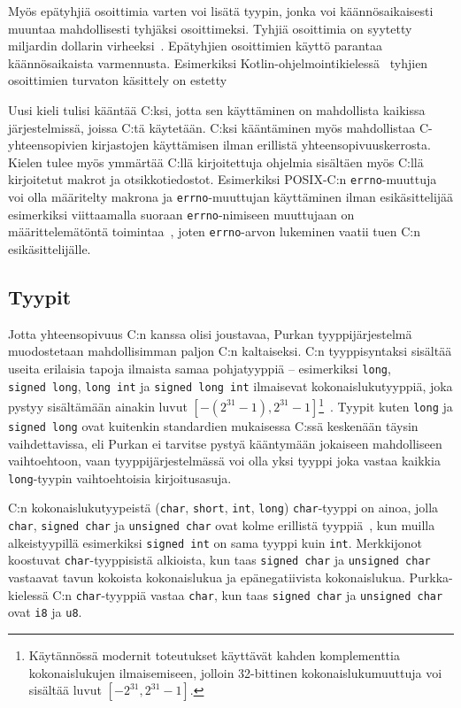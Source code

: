 Myös epätyhjiä osoittimia varten voi lisätä tyypin, jonka voi käännösaikaisesti
muuntaa mahdollisesti tyhjäksi osoittimeksi. Tyhjiä osoittimia on syytetty
miljardin dollarin virheeksi~\citep{billiondollars}. Epätyhjien osoittimien
käyttö parantaa käännösaikaista varmennusta. Esimerkiksi
Kotlin-ohjelmointikielessä~\citep{kotlin} tyhjien osoittimien turvaton
käsittely on estetty~\citep{kotlinnullability}

Uusi kieli tulisi kääntää C:ksi, jotta sen käyttäminen on mahdollista kaikissa
järjestelmissä, joissa C:tä käytetään. C:ksi kääntäminen myös mahdollistaa
C\hyp{}yhteensopivien kirjastojen käyttämisen ilman erillistä
yhteensopivuuskerrosta. Kielen tulee myös ymmärtää C:llä kirjoitettuja ohjelmia
sisältäen myös C:llä kirjoitetut makrot ja otsikkotiedostot. Esimerkiksi
POSIX-C:n \texttt{errno}-muuttuja voi olla määritelty makrona ja
\texttt{errno}-muuttujan käyttäminen ilman esikäsittelijää esimerkiksi
viittaamalla suoraan \texttt{errno}-nimiseen muuttujaan on määrittelemätöntä
toimintaa~\citep[s. 234]{POSIX}, joten \texttt{errno}-arvon lukeminen vaatii
tuen C:n esikäsittelijälle.

\subsection{Tyypit}

Jotta yhteensopivuus C:n kanssa olisi joustavaa, Purkan tyyppijärjestelmä
muodostetaan mahdollisimman paljon C:n kaltaiseksi. C:n tyyppisyntaksi sisältää
useita erilaisia tapoja ilmaista samaa pohjatyyppiä -- esimerkiksi
\texttt{long}, \texttt{signed~long}, \texttt{long~int} ja
\texttt{signed~long~int} ilmaisevat kokonaislukutyyppiä, joka pystyy
sisältämään ainakin luvut $[-(2^{31} - 1), 2^{31}-1]$\footnote{Käytännössä
modernit toteutukset käyttävät kahden komplementtia kokonaislukujen
ilmaisemiseen, jolloin 32-bittinen kokonaislukumuuttuja voi sisältää luvut
$[-2^{31}, 2^{31} - 1]$.}~\citep[luku~5.2.4.2.1]{C18}. Tyypit kuten
\texttt{long} ja \texttt{signed long} ovat kuitenkin standardien mukaisessa
C:ssä keskenään täysin vaihdettavissa, eli Purkan ei tarvitse pystyä kääntymään
jokaiseen mahdolliseen vaihtoehtoon, vaan tyyppijärjestelmässä voi olla yksi
tyyppi joka vastaa kaikkia \texttt{long}-tyypin vaihtoehtoisia kirjoitusasuja.

C:n kokonaislukutyypeistä (\texttt{char}, \texttt{short}, \texttt{int},
\texttt{long}) \texttt{char}-tyyppi on ainoa, jolla \texttt{char},
\texttt{signed char} ja \texttt{unsigned char} ovat kolme erillistä
tyyppiä~\citep{C18}, kun muilla alkeistyypillä esimerkiksi \texttt{signed int}
on sama tyyppi kuin \texttt{int}. Merkkijonot koostuvat
\texttt{char}-tyyppisistä alkioista, kun taas \texttt{signed char} ja
\texttt{unsigned char} vastaavat tavun kokoista kokonaislukua ja
epänegatiivista kokonaislukua. Purkka-kielessä C:n \texttt{char}-tyyppiä
vastaa \texttt{char}, kun taas \texttt{signed char} ja \texttt{unsigned char}
ovat \texttt{i8} ja \texttt{u8}.

